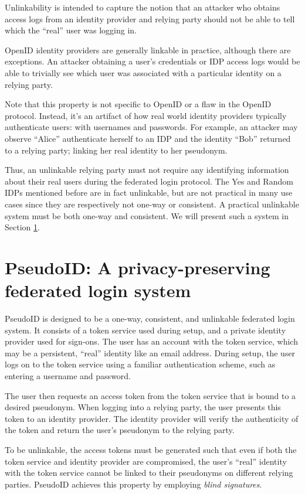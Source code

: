\documentclass{llncs}
\begin{document}
Unlinkability is intended to capture the notion that an attacker who
obtains access logs from an identity provider and relying party should
not be able to tell which the ``real'' user was logging in.

OpenID identity providers are generally linkable in practice, although
there are exceptions. An attacker obtaining a user's credentials or
IDP access logs would be able to trivially see which user was
associated with a particular identity on a relying party.

Note that this property is not specific to OpenID or a flaw in the
OpenID protocol. Instead, it's an artifact of how real world identity
providers typically authenticate users: with usernames and
passwords. For example, an attacker may observe ``Alice'' authenticate
herself to an IDP and the identity ``Bob'' returned to a relying
party; linking her real identity to her pseudonym.

Thus, an unlinkable relying party must not require any identifying
information about their real users during the federated login
protocol. The Yes and Random IDPs mentioned before are in fact
unlinkable, but are not practical in many use cases since they are
respectively not one-way or consistent. A practical unlinkable system
must be both one-way and consistent. We will present such a system in
Section \ref{sec:pseudoid}.

\section{PseudoID: A privacy-preserving federated login system}
\label{sec:pseudoid}

PseudoID is designed to be a one-way, consistent, and unlinkable
federated login system. It consists of a token service used during
setup, and a private identity provider used for sign-ons. The user has
an account with the token service, which may be a persistent, ``real''
identity like an email address. During setup, the user logs on to the
token service using a familiar authentication scheme, such as entering
a username and password.

The user then requests an access token from the token service that is
bound to a desired pseudonym. When logging into a relying party, the
user presents this token to an identity provider. The identity
provider will verify the authenticity of the token and return the
user's pseudonym to the relying party.

To be unlinkable, the access tokens must be generated such that even
if both the token service and identity provider are compromised, the
user's ``real'' identity with the token service cannot be linked to
their pseudonyms on different relying parties. PseudoID achieves this
property by employing \textit{blind signatures}.
\end{document}
